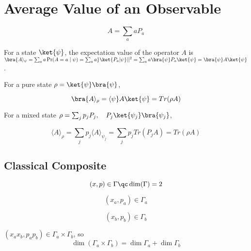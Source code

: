 \documentclass[a4paper,twoside,master.tex]{subfiles}
\begin{document}
\section{Average Value of an Observable}
\label{sec:average_value_of_an_observable}


\begin{equation}
A = \sum_a a P_a
\end{equation}

For a state $\ket{\psi}$, the expectation value of the operator
$A$ is
$\bra{ A\rangle_\psi = \sum_a a \Pr(A = a\mid\psi) = \sum_a a }\ket{P_a|\psi}||^2 = \sum_a a\bra{\psi}P_a\ket{\psi} = \bra{\psi}A\ket{\psi}$.

\begin{ex}

For a pure state $\rho = \ket{\psi}\bra{\psi}$,

\begin{equation}
\bra{ A\rangle_\rho = \langle\psi}A\ket{\psi} = Tr(\rho A)
\end{equation}

For a mixed state
$\rho = \sum_j p_j P_j,\quad P_j \ket{\psi_j}\bra{\psi_j}$,

\begin{equation}
\langle A\rangle_\rho = \sum_j p_j\langle A\rangle_{\psi_j} = \sum_j p_j Tr(P_j A) = Tr(\rho A)
\end{equation}
\end{ex}



\subsection{Classical Composite}
\label{sub:classical_composite}


\begin{equation}
    (x,p)\in\Gamma \qc \dim(\Gamma) = 2
\end{equation}

\begin{equation}
(x_a, p_a)\in\Gamma_a
\end{equation}

\begin{equation}
(x_b,p_b)\in\Gamma_b
\end{equation}

$(x_ax_b,p_ap_b)\in\Gamma_a\times\Gamma_b$, so
\begin{equation}
\dim(\Gamma_a\times\Gamma_b) = \dim\Gamma_a+\dim\Gamma_b
\end{equation}
\end{document}
